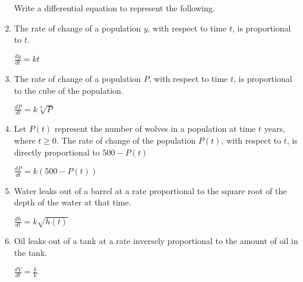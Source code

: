 \documentclass[10pt,letterpaper]{report}
\begin{document}
\begin{enumerate}
    \hline
    
  \noindent Write a differential equation to represent the following.  
  \item{The rate of change of a population $y$, with respect to time $t$, is proportional to $t$.\\}
  
    $\frac{dy}{dt}=kt$ \\
  
  \item{The rate of change of a population $P$, with respect to time $t$, is proportional to the cube of the population. \\}
  
    $\frac{dP}{dt}=k\sqrt[3]{P}$ \\
    
  \item{Let $P(t)$ represent the number of wolves in a population at time $t$ years, where $t\geq 0$. The rate of change of the population $P(t)$, with respect to $t$, is directly proportional to $500-P(t)$\\}
  
    $\frac{dP}{dt}=k(500-P(t))$ \\
    
  \item{Water leaks out of a barrel at a rate proportional to the square root of the depth of the water at that time. \\}
  
    $\frac{dh}{dt}=k\sqrt{h(t)}$ \\
    
  \item{Oil leaks out of a tank at a rate inversely proportional to the amount of oil in the tank. \\} 
  
    $\frac{dV}{dt}=\frac{k}{V}$
    
\end{enumerate}
\end{document}

